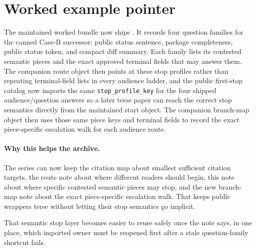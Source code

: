 \documentclass[11pt]{article}
\begin{document}
\section{Worked example pointer}
The maintained worked bundle now ships .\cite{series:workedexample}
It records four question families for the canned Case-B successor: public status sentence, package completeness, public status token, and compact diff summary.
Each family lists its contested semantic pieces and the exact approved terminal fields that may answer them.
The companion route object then points at these stop profiles rather than repeating terminal-field lists in every audience ladder, and the public first-stop catalog now imports the same \texttt{stop\_profile\_key} for the four shipped audience/question answers so a later terse paper can reach the correct stop semantics directly from the maintained start object. The companion branch-map object then uses those same piece keys and terminal fields to record the exact piece-specific escalation walk for each audience route.\cite{series:challengeroutes,series:challengebranches}

\paragraph{Why this helps the archive.}
The series can now keep the citation map about smallest sufficient citation targets, the route note about where different readers should begin, this note about where specific contested semantic pieces may stop, and the new branch-map note about the exact piece-specific escalation walk.
That keeps public wrappers terse without letting their stop semantics go implicit.

\noindent That semantic stop layer becomes easier to reuse safely once the note says, in one place, which imported owner must be reopened first after a stale question-family shortcut fails.
\end{document}
